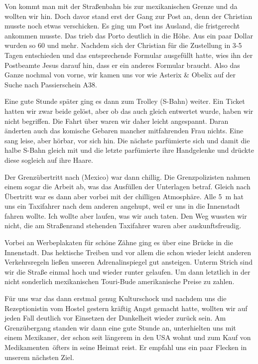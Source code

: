 Von  kommt man mit der Straßenbahn bis zur mexikanischen Grenze und da wollten wir hin.
Doch davor stand erst der Gang zur Post an, denn der Christian musste noch etwas verschicken.
Es ging um Post ins Ausland, die fristgerecht ankommen musste.
Das trieb das Porto deutlich in die Höhe.
Aus ein paar Dollar wurden so 60 und mehr.
Nachdem sich der Christian für die Zustellung in 3-5 Tagen entschieden und das entsprechende Formular ausgefüllt hatte, wies ihn der Postbeamte Jesus darauf hin, dass er ein anderes Formular braucht.
Also das Ganze nochmal von vorne, wir kamen uns vor wie Asterix \& Obelix auf der Suche nach Passierschein A38.

Eine gute Stunde später ging es dann zum Trolley (S-Bahn) weiter.
Ein Ticket hatten wir zwar beide gelöst, aber ob das auch gleich entwertet wurde, haben wir nicht begriffen.
Die Fahrt über waren wir daher leicht angespannt.
Daran änderten auch das komische Gebaren mancher mitfahrenden Frau nichts.
Eine sang leise, aber hörbar, vor sich hin.
Die nächste parfümierte sich und damit die halbe S-Bahn gleich mit und die letzte parfümierte ihre Handgelenke und drückte diese sogleich auf ihre Haare.

Der Grenzübertritt nach  (Mexico) war dann chillig.
Die Grenzpolizisten nahmen einem sogar die Arbeit ab, was das Ausfüllen der Unterlagen betraf.
Gleich nach Übertritt war es dann aber vorbei mit der chilligen Atmosphäre.
Alle 5~m hat uns ein Taxifahrer nach dem anderen angehupt, weil er uns in die Innenstadt fahren wollte.
Ich wollte aber laufen, was wir auch taten.
Den Weg wussten wir nicht, die am Straßenrand stehenden Taxifahrer waren aber auskunftsfreudig.

Vorbei an Werbeplakaten für schöne Zähne ging es über eine Brücke in die Innenstadt.
Das hektische Treiben und vor allem die schon wieder leicht anderen Verkehrsregeln ließen unseren Adrenalinspiegel gut ansteigen.
Unterm Strich sind wir die Straße einmal hoch und wieder runter gelaufen.
Um dann letztlich in der nicht sonderlich mexikanischen Touri-Bude amerikanische Preise zu zahlen.

Für uns war das dann erstmal genug Kulturschock und nachdem uns die Rezeptionistin vom Hostel gestern kräftig Angst gemacht hatte, wollten wir auf jeden Fall deutlich vor Einsetzen der Dunkelheit wieder zurück sein.
Am Grenzübergang standen wir dann eine gute Stunde an, unterhielten uns mit einem Mexikaner, der schon seit längerem in den USA wohnt und zum Kauf von \glqq Medikamenten\grqq \, öfters in seine Heimat reist.
Er empfahl uns ein paar Flecken in  unserem nächsten Ziel.
